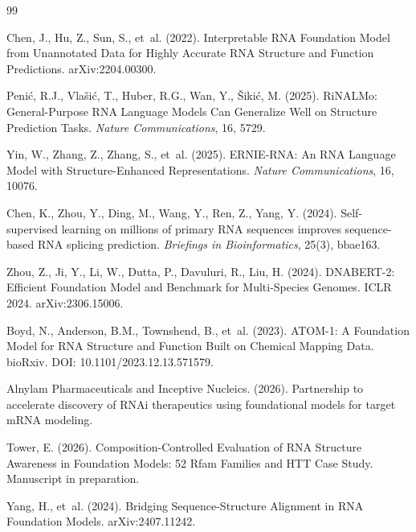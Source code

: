 \documentclass[11pt]{article}
\begin{document}

\begin{thebibliography}{99}

Chen, J., Hu, Z., Sun, S., et~al. (2022).
Interpretable RNA Foundation Model from Unannotated Data for Highly
Accurate RNA Structure and Function Predictions.
arXiv:2204.00300.

Peni\'c, R.J., Vla\v{s}i\'c, T., Huber, R.G., Wan, Y., \v{S}iki\'c, M. (2025).
RiNALMo: General-Purpose RNA Language Models Can Generalize Well on
Structure Prediction Tasks.
\emph{Nature Communications}, 16, 5729.

Yin, W., Zhang, Z., Zhang, S., et~al. (2025).
ERNIE-RNA: An RNA Language Model with Structure-Enhanced Representations.
\emph{Nature Communications}, 16, 10076.

Chen, K., Zhou, Y., Ding, M., Wang, Y., Ren, Z., Yang, Y. (2024).
Self-supervised learning on millions of primary RNA sequences improves
sequence-based RNA splicing prediction.
\emph{Briefings in Bioinformatics}, 25(3), bbae163.

Zhou, Z., Ji, Y., Li, W., Dutta, P., Davuluri, R., Liu, H. (2024).
DNABERT-2: Efficient Foundation Model and Benchmark for Multi-Species
Genomes. ICLR 2024. arXiv:2306.15006.

Boyd, N., Anderson, B.M., Townshend, B., et~al. (2023).
ATOM-1: A Foundation Model for RNA Structure and Function Built on
Chemical Mapping Data. bioRxiv. DOI: 10.1101/2023.12.13.571579.

Alnylam Pharmaceuticals and Inceptive Nucleics. (2026).
Partnership to accelerate discovery of RNAi therapeutics using
foundational models for target mRNA modeling.

Tower, E. (2026).
Composition-Controlled Evaluation of RNA Structure Awareness in
Foundation Models: 52 Rfam Families and HTT Case Study.
Manuscript in preparation.

Yang, H., et~al. (2024).
Bridging Sequence-Structure Alignment in RNA Foundation Models.
arXiv:2407.11242.


\end{thebibliography}
\end{document}
